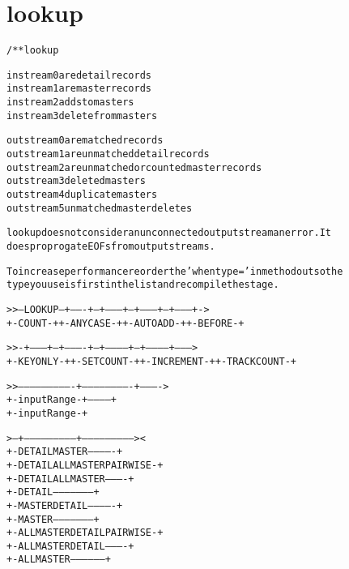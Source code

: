 \section{lookup}
\begin{shaded}
\begin{alltt}
/** lookup

   in stream 0 are detail records
   in stream 1 are master records
   in stream 2 adds to masters
   in stream 3 delete from masters

   out stream 0 are matched records
   out stream 1 are unmatched detail records
   out stream 2 are unmatched or counted master records
   out stream 3 deleted masters
   out stream 4 duplicate masters
   out stream 5 unmatched master deletes

   lookup does not consider an unconnected output stream an error.  It
   does proprogate EOFs from output streams.

   To increase performance reorder the 'when type=' in method out so the
   type you use is first in the list and recompile the stage.


   >>--LOOKUP--+-------+--+---------+--+---------+--+--------+->
               +-COUNT-+  +-ANYCASE-+  +-AUTOADD-+  +-BEFORE-+

   >>-+---------+--+----------+--+-----------+--+------------+-------->
      +-KEYONLY-+  +-SETCOUNT-+  +-INCREMENT-+  +-TRACKCOUNT-+

   >>----------------------------+-------------------------+---------->
                                 +-inputRange-+------------+
                                              +-inputRange-+

   >--+---------------------------+---------------------------><
      +-DETAIL MASTER-------------+
      +-DETAIL ALLMASTER PAIRWISE-+
      +-DETAIL ALLMASTER----------+
      +-DETAIL--------------------+
      +-MASTER DETAIL-------------+
      +-MASTER--------------------+
      +-ALLMASTER DETAIL PAIRWISE-+
      +-ALLMASTER DETAIL----------+
      +-ALLMASTER-----------------+

\end{alltt}
\end{shaded}
